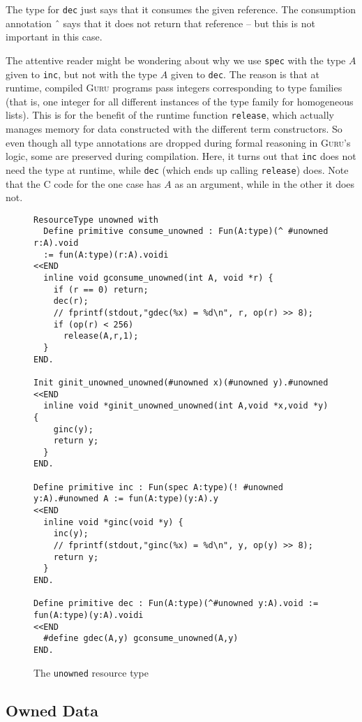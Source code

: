 \documentclass[9pt,natbib]{sigplanconf}
\begin{document}
\begin{itemize}
The type for \texttt{dec} just says that it consumes the given
reference.  The consumption annotation \^{\ } says that it does not
return that reference -- but this is not important in this case.

\end{itemize}

The attentive reader might be wondering about why we use \texttt{spec}
with the type $A$ given to \texttt{inc}, but not with the type $A$
given to \texttt{dec}.  The reason is that at runtime, compiled
\textsc{Guru} programs pass integers corresponding to type families
(that is, one integer for all different instances of the type family
for homogeneous lists).  This is for the benefit of the runtime
function \texttt{release}, which actually manages memory for data
constructed with the different term constructors.  So even though all
type annotations are dropped during formal reasoning in
\textsc{Guru}'s logic, some are preserved during compilation.  Here,
it turns out that \texttt{inc} does not need the type at runtime,
while \texttt{dec} (which ends up calling \texttt{release}) does.
Note that the C code for the one case has $A$ as an argument, while
in the other it does not. 

\begin{figure*}
\small
\begin{verbatim}
ResourceType unowned with
  Define primitive consume_unowned : Fun(A:type)(^ #unowned r:A).void 
  := fun(A:type)(r:A).voidi
<<END
  inline void gconsume_unowned(int A, void *r) {
    if (r == 0) return;
    dec(r);
    // fprintf(stdout,"gdec(%x) = %d\n", r, op(r) >> 8);
    if (op(r) < 256)
      release(A,r,1);
  }
END.

Init ginit_unowned_unowned(#unowned x)(#unowned y).#unowned 
<<END
  inline void *ginit_unowned_unowned(int A,void *x,void *y) {
    ginc(y);
    return y;
  }
END.

Define primitive inc : Fun(spec A:type)(! #unowned y:A).#unowned A := fun(A:type)(y:A).y 
<<END
  inline void *ginc(void *y) {
    inc(y);
    // fprintf(stdout,"ginc(%x) = %d\n", y, op(y) >> 8);
    return y;
  }
END.

Define primitive dec : Fun(A:type)(^#unowned y:A).void := fun(A:type)(y:A).voidi 
<<END
  #define gdec(A,y) gconsume_unowned(A,y)
END.
\end{verbatim}
\caption{The \texttt{unowned} resource type}
\label{fig:unowned}
\end{figure*}

\subsection{Owned Data}
\end{document}
